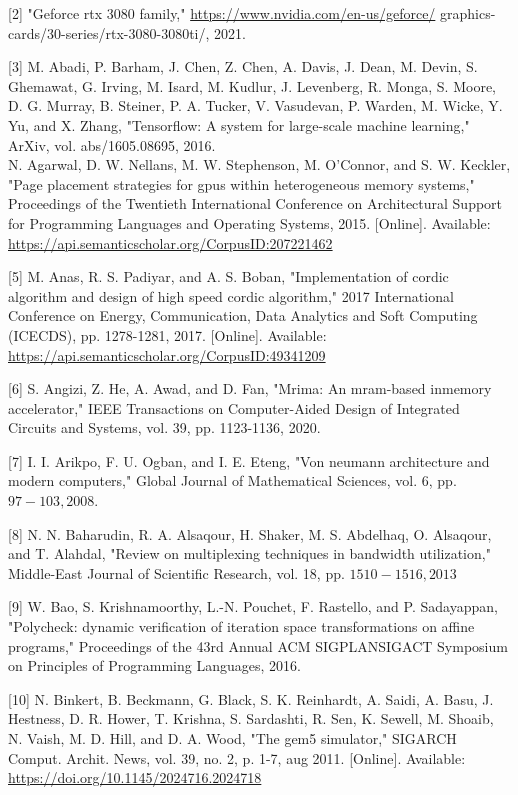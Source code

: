 \documentclass[10pt]{article}
\begin{document}
[2] "Geforce rtx 3080 family," \href{https://www.nvidia.com/en-us/geforce/}{https://www.nvidia.com/en-us/geforce/} graphics-cards/30-series/rtx-3080-3080ti/, 2021.

[3] M. Abadi, P. Barham, J. Chen, Z. Chen, A. Davis, J. Dean, M. Devin, S. Ghemawat, G. Irving, M. Isard, M. Kudlur, J. Levenberg, R. Monga, S. Moore, D. G. Murray, B. Steiner, P. A. Tucker, V. Vasudevan, P. Warden, M. Wicke, Y. Yu, and X. Zhang, "Tensorflow: A system for large-scale machine learning," ArXiv, vol. abs/1605.08695, 2016.\\
[4] N. Agarwal, D. W. Nellans, M. W. Stephenson, M. O'Connor, and S. W. Keckler, "Page placement strategies for gpus within heterogeneous memory systems," Proceedings of the Twentieth International Conference on Architectural Support for Programming Languages and Operating Systems, 2015. [Online]. Available: \href{https://api.semanticscholar.org/CorpusID:207221462}{https://api.semanticscholar.org/CorpusID:207221462}

[5] M. Anas, R. S. Padiyar, and A. S. Boban, "Implementation of cordic algorithm and design of high speed cordic algorithm," 2017 International Conference on Energy, Communication, Data Analytics and Soft Computing (ICECDS), pp. 1278-1281, 2017. [Online]. Available: \href{https://api.semanticscholar.org/CorpusID:49341209}{https://api.semanticscholar.org/CorpusID:49341209}

[6] S. Angizi, Z. He, A. Awad, and D. Fan, "Mrima: An mram-based inmemory accelerator," IEEE Transactions on Computer-Aided Design of Integrated Circuits and Systems, vol. 39, pp. 1123-1136, 2020.

[7] I. I. Arikpo, F. U. Ogban, and I. E. Eteng, "Von neumann architecture and modern computers," Global Journal of Mathematical Sciences, vol. 6, pp. $97-103,2008$.

[8] N. N. Baharudin, R. A. Alsaqour, H. Shaker, M. S. Abdelhaq, O. Alsaqour, and T. Alahdal, "Review on multiplexing techniques in bandwidth utilization," Middle-East Journal of Scientific Research, vol. 18, pp. $1510-1516,2013$

[9] W. Bao, S. Krishnamoorthy, L.-N. Pouchet, F. Rastello, and P. Sadayappan, "Polycheck: dynamic verification of iteration space transformations on affine programs," Proceedings of the 43rd Annual ACM SIGPLANSIGACT Symposium on Principles of Programming Languages, 2016.

[10] N. Binkert, B. Beckmann, G. Black, S. K. Reinhardt, A. Saidi, A. Basu, J. Hestness, D. R. Hower, T. Krishna, S. Sardashti, R. Sen, K. Sewell, M. Shoaib, N. Vaish, M. D. Hill, and D. A. Wood, "The gem5 simulator," SIGARCH Comput. Archit. News, vol. 39, no. 2, p. 1-7, aug 2011. [Online]. Available: \href{https://doi.org/10.1145/2024716.2024718}{https://doi.org/10.1145/2024716.2024718}
\end{document}

